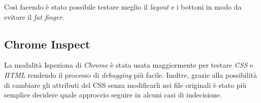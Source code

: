 Così facendo è stato possibile testare meglio il \textit{layout} e i bottoni in modo da evitare il \textit{fat finger}.

\subsection{Chrome Inspect}
La modalità Ispeziona di \textit{Chrome} è stata usata maggiormente per testare \textit{CSS} e \textit{HTML} rendendo il processo di \textit{debugging} più facile. Inoltre, grazie alla possibilità di cambiare gli attributi del CSS senza modificarli nei file originali è stato più semplice decidere quale approccio seguire in alcuni casi di indecisione.


